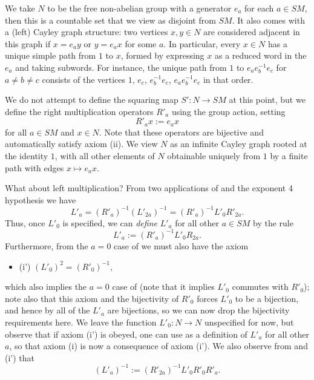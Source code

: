 We take $N$ to be the free non-abelian group with a generator $e_a$ for each $a \in SM$, then this is a countable set that we view as disjoint from $SM$.  It also comes with a (left) Cayley graph structure: two vertices $x,y \in N$ are considered adjacent in this graph if $x = e_a y$ or $y = e_a x$ for some $a$.  In particular, every $x \in N$ has a unique simple path from $1$ to $x$, formed by expressing $x$ as a reduced word in the $e_a$ and taking subwords.  For instance, the unique path from $1$ to $e_a e_b^{-1} e_c$ for $a \neq b \neq c$ consists of the vertices $1$, $e_c$, $e_b^{-1} e_c$, $e_a e_b^{-1} e_c$ in that order.

We do not attempt to define the squaring map $S': N \to SM$ at this point, but we define the right multiplication operators $R'_a$ using the group action, setting
\begin{equation}\label{ra-def}
  R'_a x := e_a x
\end{equation}
for all $a \in SM$ and $x \in N$.  Note that these operators are bijective and automatically satisfy axiom (ii).  We view $N$ as an infinite Cayley graph rooted at the identity $1$, with all other elements of $N$ obtainable uniquely from $1$ by a finite path with edges $x \mapsto e_a x$.

What about left multiplication?  From two applications of  and the exponent 4 hypothesis we have
$$ L'_a = (R'_a)^{-1} (L'_{2a})^{-1} = (R'_a)^{-1} L'_0 R'_{2a}.$$
Thus, once $L'_0$ is specified, we can \emph{define} $L'_a$ for all other $a \in SM$ by the rule
\begin{equation}\label{la0}
  L'_a := (R'_a)^{-1} L'_0 R_{2a}.
\end{equation}
Furthermore, from the $a=0$ case of  we must also have the axiom
\begin{itemize}
  \item (i') $(L'_0)^2 = (R'_0)^{-1}$,
\end{itemize}
which also implies the $a=0$ case of  (note that it implies $L'_0$ commutes with $R'_0$); note also that this axiom and the bijectivity of $R'_0$ forces $L'_0$ to be a bijection, and hence by  all of the $L'_a$ are bijections, so we can now drop the bijectivity requirements here.  We leave the function $L'_0: N \to N$ unspecified for now, but observe that if axiom (i') is obeyed, one can use  as a definition of $L'_a$ for all other $a$, so that axiom (i) is now a consequence of axiom (i').  We also observe from  and (i') that
\begin{equation}\label{la1}
  (L'_a)^{-1} := (R'_{2a})^{-1} L'_0 R'_0 R'_{a}.
\end{equation}


